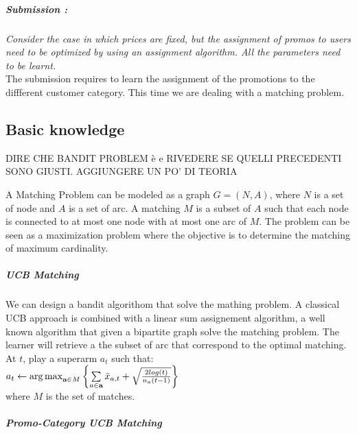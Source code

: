 \subparagraph*{Submission : }
\textit{Consider the case in which prices are fixed, but the assignment of promos to users need to be optimized by using an assignment algorithm. All the parameters need to be learnt.}\\

The submission requires to learn the assignment of the promotions to the diffferent customer category. This time we are dealing with a matching problem. 

\subsection*{Basic knowledge}
DIRE CHE BANDIT PROBLEM è e RIVEDERE SE QUELLI PRECEDENTI SONO GIUSTI. AGGIUNGERE UN PO' DI TEORIA

A Matching Problem can be modeled as a graph $G=(N,A)$, where $N$ is a set of node and $A$ is a set of arc. A matching $M$ is a subset of $A$ such that each node is connected to at most one node with at most one arc of $M$. The problem can be seen as a maximization problem where the objective is to determine the matching of maximum cardinality.\\

\subparagraph*{UCB Matching}
We can design a bandit algorithom that solve the mathing problem. A classical UCB approach is combined with a linear sum assignement algorithm, a well known algorithm that given a bipartite graph solve the matching problem. The learner will retrieve a the subset of arc that correspond to the optimal matching. 
At $t$, play a superarm $a_{t}$ such that:\\
$a_{t} \leftarrow \operatorname{arg\,max}\limits_{\textbf{a} \in M}{\left\{\sum\limits_{a \in \textbf{a}}\bar{x}_{a,t} + \sqrt{\frac{2 log(t)}{{n_{a}(t-1)}} }\right\}}$ \\
where $M$ is the set of matches.

\subparagraph*{Promo-Category UCB Matching}

